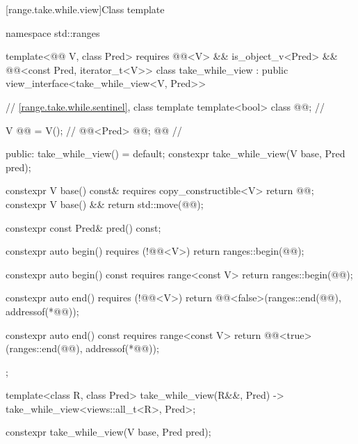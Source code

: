 [range.take.while.view]{Class template }

%
%
%
%
\begin{codeblock}
namespace std::ranges {
  template<@@ V, class Pred>
    requires @@<V> && is_object_v<Pred> &&
             @@<const Pred, iterator_t<V>>
  class take_while_view : public view_interface<take_while_view<V, Pred>> {
    // \ref{range.take.while.sentinel}, class template 
    template<bool> class @@;                      // \expos

    V @@ = V();                                      // \expos
    @@<Pred> @@; @\itcorr[-1]@                       // \expos

  public:
    take_while_view() = default;
    constexpr take_while_view(V base, Pred pred);

    constexpr V base() const& requires copy_constructible<V> { return @@; }
    constexpr V base() && { return std::move(@@); }

    constexpr const Pred& pred() const;

    constexpr auto begin() requires (!@@<V>)
    { return ranges::begin(@@); }

    constexpr auto begin() const requires range<const V>
    { return ranges::begin(@@); }

    constexpr auto end() requires (!@@<V>)
    { return @@<false>(ranges::end(@@), addressof(*@@)); }

    constexpr auto end() const requires range<const V>
    { return @@<true>(ranges::end(@@), addressof(*@@)); }
  };

  template<class R, class Pred>
    take_while_view(R&&, Pred) -> take_while_view<views::all_t<R>, Pred>;
}
\end{codeblock}

%
\begin{itemdecl}
constexpr take_while_view(V base, Pred pred);
\end{itemdecl}


